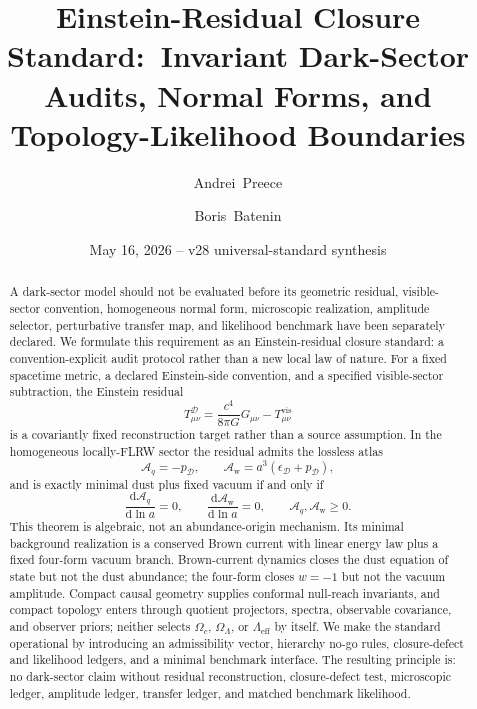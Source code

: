 \documentclass[
  aps,
  prd,
  reprint,
  superscriptaddress,
  floatfix,
  nofootinbib,
  longbibliography
]{revtex4-2}
\theoremstyle{plain}
\theoremstyle{definition}
\theoremstyle{remark}
\newcommand{\dd}{\mathrm d}
\newcommand{\D}{\mathcal D}
\newcommand{\vis}{\mathrm{vis}}
\newcommand{\eff}{\mathrm{eff}}
\newcommand{\Aq}{\mathcal A_q}
\newcommand{\Aw}{\mathcal A_{\mathrm w}}
\newcommand{\eps}{\epsilon}
\begin{document}
\raggedbottom

\title{\texorpdfstring{Einstein-Residual Closure Standard:\
Invariant Dark-Sector Audits, Normal Forms, and Topology-Likelihood Boundaries}
{Einstein-Residual Closure Standard: Invariant Dark-Sector Audits, Normal Forms, and Topology-Likelihood Boundaries}}

\author{Andrei~Preece}

\author{Boris~Batenin}

\date{May 16, 2026 -- v28 universal-standard synthesis}

\begin{abstract}
A dark-sector model should not be evaluated before its geometric residual,
visible-sector convention, homogeneous normal form, microscopic realization,
amplitude selector, perturbative transfer map, and likelihood benchmark have
been separately declared.  We formulate this requirement as an
Einstein-residual closure standard: a convention-explicit audit protocol rather
than a new local law of nature.  For a fixed spacetime metric, a declared
Einstein-side convention, and a specified visible-sector subtraction, the
Einstein residual
\[
T^\D_{\mu\nu}=\frac{c^4}{8\pi G}G_{\mu\nu}-T^{\vis}_{\mu\nu}
\]
is a covariantly fixed reconstruction target rather than a source assumption.
In the homogeneous locally-FLRW sector the residual admits the lossless atlas
\[
\Aq=-p_\D,
\qquad
\Aw=a^3(\eps_\D+p_\D),
\]
and is exactly minimal dust plus fixed vacuum if and only if
\[
\frac{\dd\Aq}{\dd\ln a}=0,
\qquad
\frac{\dd\Aw}{\dd\ln a}=0,
\qquad
\Aq,\Aw\ge0 .
\]
This theorem is algebraic, not an abundance-origin mechanism.  Its minimal
background realization is a conserved Brown current with linear energy law plus
a fixed four-form vacuum branch.  Brown-current dynamics closes the dust
equation of state but not the dust abundance; the four-form closes \(w=-1\) but
not the vacuum amplitude.  Compact causal geometry supplies conformal null-reach
invariants, and compact topology enters through quotient projectors, spectra,
observable covariance, and observer priors; neither selects \(\Omega_c\),
\(\Omega_\Lambda\), or \(\Lambda_{\eff}\) by itself.  We make the standard
operational by introducing an admissibility vector, hierarchy no-go rules,
closure-defect and likelihood ledgers, and a minimal benchmark interface.  The
resulting principle is: no dark-sector claim without residual reconstruction,
closure-defect test, microscopic ledger, amplitude ledger, transfer ledger, and
matched benchmark likelihood.
\end{abstract}
\end{document}

